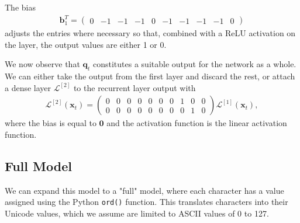 \documentclass{somasmsc}
\begin{document}
The bias 
\begin{align*}
\pmb{b}_1^T =
\begin{pmatrix}
0 & -1 & -1 & -1 & 0 & -1 & -1 & -1 & -1 & 0
\end{pmatrix}
\end{align*}
adjusts the entries where necessary so that, combined with a ReLU activation on the layer, the output values are either 1 or 0.

We now observe that $\pmb{q}_t$ constitutes a suitable output for the network as a whole. We can either take the output from the first layer and discard the rest, or attach a dense layer $\mathcal{L}^{\left[2\right]}$ to the recurrent layer output with
\begin{align*}
\mathcal{L}^{\left[2\right]}\left(\pmb{x}_t\right) =
\begin{pmatrix}
    0 & 0 & 0 & 0 & 0 & 0 & 0 & 1 & 0 & 0 \\
    0 & 0 & 0 & 0 & 0 & 0 & 0 & 0 & 1 & 0
\end{pmatrix}
\mathcal{L}^{\left[1\right]}\left(\pmb{x}_t\right),
\end{align*}
where the bias is equal to $\mathbf{0}$ and the activation function is the linear activation function.

\subsection{Full Model}\label{zeroone:full}

We can expand this model to a "full" model, where each character has a value assigned using the Python \verb|ord()| function. This translates characters into their Unicode values, which we assume are limited to ASCII values of 0 to 127.
\end{document}
